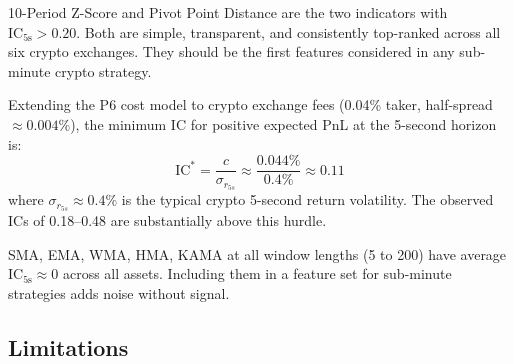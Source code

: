 \documentclass[12pt,a4paper]{article}
\theoremstyle{definition}
\theoremstyle{remark}
\newcommand{\IC}{\mathrm{IC}}
\begin{document}
\begin{findingbox}
10-Period Z-Score and Pivot Point Distance are the two indicators with
$\IC_{5\text{s}} > 0.20$. Both are simple, transparent, and
consistently top-ranked across all six crypto exchanges. They should
be the first features considered in any sub-minute crypto strategy.
\end{findingbox}

\begin{findingbox}
Extending the P6 cost model to crypto exchange fees (0.04\% taker,
half-spread $\approx 0.004\%$), the minimum IC for positive expected
PnL at the 5-second horizon is:
\begin{equation*}
  \IC^* = \frac{c}{\sigma_{r_{5s}}}
    \approx \frac{0.044\%}{0.4\%} \approx 0.11
\end{equation*}
where $\sigma_{r_{5s}}\approx 0.4\%$ is the typical crypto 5-second
return volatility. The observed ICs of 0.18--0.48 are substantially
above this hurdle.
\end{findingbox}

\begin{findingbox}
SMA, EMA, WMA, HMA, KAMA at all window lengths (5 to 200) have average
$\IC_{5\text{s}}\approx 0$ across all assets. Including them in a
feature set for sub-minute strategies adds noise without signal.
\end{findingbox}

\subsection{Limitations}
\label{sec:limitations}
\end{document}
